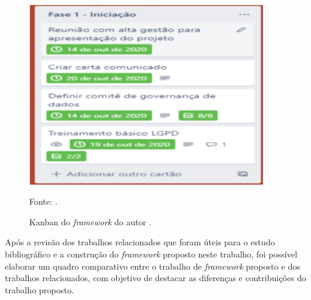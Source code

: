 \documentclass[
	12pt,				%
	openright,			%
	oneside,			%
	a4paper,			%
	english,			%
	french,				%
	spanish,			%
	brazil,				%
	]{abntex2}
\begin{document}
\begin{figure}[ht]
    \centering
    \caption{Kanban do \textit{framework} do autor \cite{silva2021w}.}
    \includegraphics[width=4.0in]{Images/17Silva2021.png}
    \label{fig: grafico-acc}
    
    \centering \small Fonte: \cite{silva2021w}.
\end{figure}

Após a revisão dos trabalhos relacionados que foram úteis para o estudo bibliográfico e a construção do \textit{framework} proposto neste trabalho, foi possível elaborar um quadro comparativo entre o trabalho de \textit{framework} proposto e dos trabalhos relacionados, com objetivo de destacar as diferenças e contribuições do trabalho proposto. 
\end{document}
